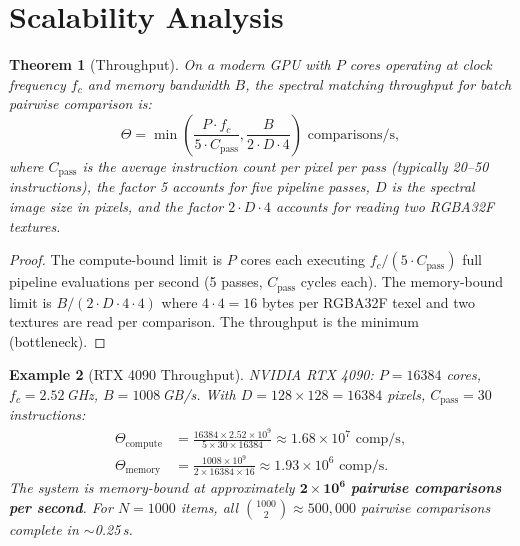 \documentclass[11pt,twocolumn,a4paper]{article}
\newtheorem{theorem}{Theorem}[section]
\newtheorem{example}[theorem]{Example}
\begin{document}


\section{Scalability Analysis}
\label{sec:scalability}

\begin{theorem}[Throughput]
\label{thm:throughput}
On a modern GPU with $P$ cores operating at clock frequency $f_c$ and
memory bandwidth $B$, the spectral matching throughput for batch
pairwise comparison is:
\begin{equation}
\label{eq:throughput}
  \Theta = \min\left(\frac{P \cdot f_c}{5 \cdot C_{\text{pass}}},
    \frac{B}{2 \cdot D \cdot 4}\right) \text{ comparisons/s},
\end{equation}
where $C_{\text{pass}}$ is the average instruction count per pixel per
pass (typically 20--50 instructions), the factor 5 accounts for five
pipeline passes, $D$ is the spectral image size in pixels, and the
factor $2 \cdot D \cdot 4$ accounts for reading two RGBA32F textures.
\end{theorem}

\begin{proof}
The compute-bound limit is $P$ cores each executing
$f_c / (5 \cdot C_{\text{pass}})$ full pipeline evaluations per second
(5 passes, $C_{\text{pass}}$ cycles each). The memory-bound limit is
$B / (2 \cdot D \cdot 4 \cdot 4)$ where $4 \cdot 4 = 16$ bytes per
RGBA32F texel and two textures are read per comparison. The throughput
is the minimum (bottleneck).
\end{proof}

\begin{example}[RTX 4090 Throughput]
NVIDIA RTX 4090: $P = 16384$ cores, $f_c = 2.52$\,GHz,
$B = 1008$\,GB/s. With $D = 128 \times 128 = 16384$ pixels,
$C_{\text{pass}} = 30$ instructions:
\begin{align}
  \Theta_{\text{compute}} &= \frac{16384 \times 2.52 \times 10^9}{5
    \times 30 \times 16384} \approx 1.68 \times 10^7 \text{ comp/s}, \\
  \Theta_{\text{memory}} &= \frac{1008 \times 10^9}{2 \times 16384
    \times 16} \approx 1.93 \times 10^6 \text{ comp/s}.
\end{align}
The system is memory-bound at approximately $\mathbf{2 \times 10^6}$
\textbf{pairwise comparisons per second}. For $N = 1000$ items, all
$\binom{1000}{2} \approx 500{,}000$ pairwise comparisons complete in
$\sim$0.25\,s.
\end{example}
\end{document}
